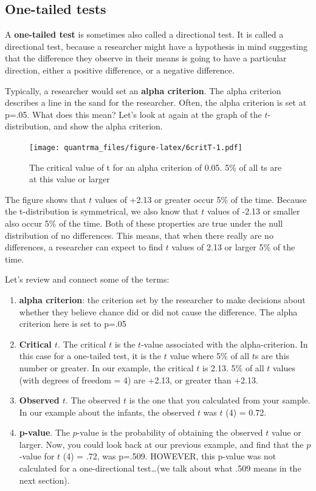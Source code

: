 \documentclass[
]{book}
\begin{document}
\hypertarget{one-tailed-tests}{%
\subsection{One-tailed tests}\label{one-tailed-tests}}

A \textbf{one-tailed test} is sometimes also called a directional test. It is called a directional test, because a researcher might have a hypothesis in mind suggesting that the difference they observe in their means is going to have a particular direction, either a positive difference, or a negative difference.

Typically, a researcher would set an \textbf{alpha criterion}. The alpha criterion describes a line in the sand for the researcher. Often, the alpha criterion is set at p=.05. What does this mean? Let's look at again at the graph of the \(t\)-distribution, and show the alpha criterion.

\begin{figure}
\centering
\texttt{[image: quantrma\_files/figure-latex/6critT-1.pdf]}
\caption{\label{fig:6critT}The critical value of t for an alpha criterion of 0.05. 5\% of all ts are at this value or larger}
\end{figure}

The figure shows that \(t\) values of +2.13 or greater occur 5\% of the time. Because the t-distribution is symmetrical, we also know that \(t\) values of -2.13 or smaller also occur 5\% of the time. Both of these properties are true under the null distribution of no differences. This means, that when there really are no differences, a researcher can expect to find \(t\) values of 2.13 or larger 5\% of the time.

Let's review and connect some of the terms:

\begin{enumerate}
\def\labelenumi{\arabic{enumi}.}
\item
  \textbf{alpha criterion}: the criterion set by the researcher to make decisions about whether they believe chance did or did not cause the difference. The alpha criterion here is set to p=.05
\item
  \textbf{Critical \(t\)}. The critical \(t\) is the \(t\)-value associated with the alpha-criterion. In this case for a one-tailed test, it is the \(t\) value where 5\% of all \(t\)s are this number or greater. In our example, the critical \(t\) is 2.13. 5\% of all \(t\) values (with degrees of freedom = 4) are +2.13, or greater than +2.13.
\item
  \textbf{Observed \(t\)}. The observed \(t\) is the one that you calculated from your sample. In our example about the infants, the observed \(t\) was \(t\) (4) = 0.72.
\item
  \textbf{p-value}. The \(p\)-value is the probability of obtaining the observed \(t\) value or larger. Now, you could look back at our previous example, and find that the \(p\)-value for \(t\) (4) = .72, was p=.509. HOWEVER, this p-value was not calculated for a one-directional test\ldots(we talk about what .509 means in the next section).
\end{enumerate}
\end{document}
